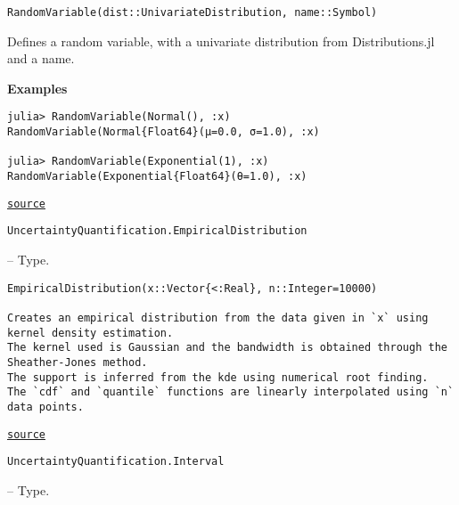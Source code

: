 \begin{adjustwidth}{2em}{0pt}


\begin{verbatim}
RandomVariable(dist::UnivariateDistribution, name::Symbol)
\end{verbatim}

Defines a random variable, with a univariate distribution from Distributions.jl and a name.

\textbf{Examples}


\begin{verbatim}
julia> RandomVariable(Normal(), :x)
RandomVariable(Normal{Float64}(μ=0.0, σ=1.0), :x)

julia> RandomVariable(Exponential(1), :x)
RandomVariable(Exponential{Float64}(θ=1.0), :x)
\end{verbatim}



\href{https://github.com/friesischscott/UncertaintyQuantification.jl/blob/f5ee6cce729f0d6a57979257379c942cdf42f86f/src/inputs/randomvariables/randomvariable.jl#L1-L15}{\texttt{source}}


\end{adjustwidth}
\hypertarget{18426214934190206718}{\texttt{UncertaintyQuantification.EmpiricalDistribution}}  -- {Type.}

\begin{adjustwidth}{2em}{0pt}


\begin{verbatim}
EmpiricalDistribution(x::Vector{<:Real}, n::Integer=10000)

Creates an empirical distribution from the data given in `x` using kernel density estimation.
The kernel used is Gaussian and the bandwidth is obtained through the Sheather-Jones method.
The support is inferred from the kde using numerical root finding.
The `cdf` and `quantile` functions are linearly interpolated using `n` data points.
\end{verbatim}



\href{https://github.com/friesischscott/UncertaintyQuantification.jl/blob/f5ee6cce729f0d6a57979257379c942cdf42f86f/src/inputs/empiricaldistribution.jl#L1-L8}{\texttt{source}}


\end{adjustwidth}
\hypertarget{16181946445135277992}{\texttt{UncertaintyQuantification.Interval}}  -- {Type.}

